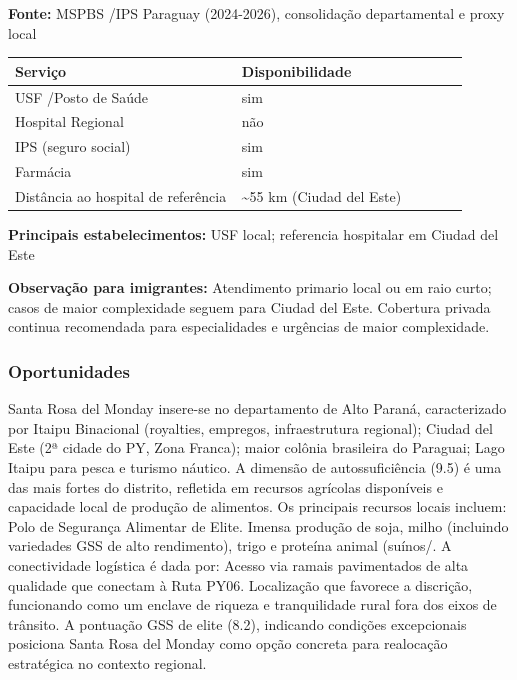 \textbf{Fonte:} MSPBS /\allowbreak  IPS Paraguay (2024-2026), consolidação
departamental e proxy local

{\def\LTcaptype{none} %
\begin{longtable}{@{}>{\raggedright\arraybackslash}p{0.45\linewidth} >{\raggedright\arraybackslash}p{0.45\linewidth}@{}}
\toprule\noalign{}
Serviço & Disponibilidade \\
\midrule\noalign{}
\endhead
\bottomrule\noalign{}
\endlastfoot
USF /\allowbreak  Posto de Saúde & sim \\
Hospital Regional & não \\
IPS (seguro social) & sim \\
Farmácia & sim \\
Distância ao hospital de referência & \textasciitilde55 km (Ciudad del
Este) \\
\end{longtable}
}

\textbf{Principais estabelecimentos:} USF local; referencia hospitalar
em Ciudad del Este

\textbf{Observação para imigrantes:} Atendimento primario local ou em
raio curto; casos de maior complexidade seguem para Ciudad del Este.
Cobertura privada continua recomendada para especialidades e urgências
de maior complexidade.
\newpage

\subsubsection*{Oportunidades}\label{oport-santa-rosa-del-monday-1015}
Santa Rosa del Monday insere-se no departamento de Alto Paraná, caracterizado por Itaipu Binacional (royalties, empregos, infraestrutura regional); Ciudad del Este (2ª cidade do PY, Zona Franca); maior colônia brasileira do Paraguai; Lago Itaipu para pesca e turismo náutico. A dimensão de autossuficiência (9.5) é uma das mais fortes do distrito, refletida em recursos agrícolas disponíveis e capacidade local de produção de alimentos. Os principais recursos locais incluem: Polo de Segurança Alimentar de Elite. Imensa produção de soja, milho (incluindo variedades GSS de alto rendimento), trigo e proteína animal (suínos/. A conectividade logística é dada por: Acesso via ramais pavimentados de alta qualidade que conectam à Ruta PY06. Localização que favorece a discrição, funcionando como um enclave de riqueza e tranquilidade rural fora dos eixos de trânsito. A pontuação GSS de elite (8.2), indicando condições excepcionais posiciona Santa Rosa del Monday como opção concreta para realocação estratégica no contexto regional.

